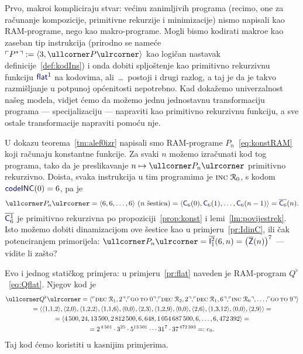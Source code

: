 Prvo, makroi kompliciraju stvar: većinu zanimljivih programa (recimo, one za računanje kompozicije, primitivne rekurzije i minimizacije) nismo napisali kao RAM-programe, nego kao makro-programe. Mogli bismo kodirati makroe kao zaseban tip instrukcija (prirodno se nameće $\kins{P^*}:=\langle3,\kprog{P}\rangle$ kao logičan nastavak definicije~\ref{def:kodIns}) i onda dobiti spljoštenje kao primitivno rekurzivnu funkciju $\f{flat}^1$ na kodovima, ali~\ldots\ postoji i drugi razlog, a taj je da je takvo razmišljanje u potpunoj općenitosti nepotrebno. Kad dokažemo univerzalnost našeg modela, vidjet ćemo da možemo jednu jednostavnu transformaciju programa --- specijalizaciju --- napraviti kao primitivno rekurzivnu funkciju, a sve ostale transformacije napraviti pomoću nje.


\begin{primjer}[{name=[primitivna rekurzivnost generatora koda za konstantne funkcije]}]\label{pr:kodkonst}
U dokazu teorema~\ref{tm:alef0izr} napisali smo RAM-pro\-gra\-me $P_n$~\eqref{eq:konstRAM} koji računaju konstantne funkcije. Za svaki $n$ možemo izračunati kod tog programa, tako da je preslikavanje $n\mapsto\kprog{P_n}$ primitivno rekurzivno. Doista, svaka instrukcija u tim programima je $\textsc{inc}\;\mathcal R_{0}$, s kodom $\f{codeINC}(0)=6$, pa je
\begin{equation}
    \kprog{P_n}=\langle6,6,\dotsc,6\rangle\text{ ($n$ šestica)}=\langle \f C_6(0),\f C_6(1),\dotsc,\f C_6(n-1)\rangle=\overline{\f C_6}(n)\text.
\end{equation}
$\overline{\f C_6^1}$ je primitivno rekurzivna po propoziciji~\ref{prop:konst} i lemi~\ref{lm:povijestrek}.
    Isto možemo dobiti dinamizacijom ove šestice kao u primjeru~\ref{pr:IdinC}, ili čak potenciranjem primorijela: $\kprog{P_n}=\overline{\f I_1^2}(6,n)=\bigl(\overline{\f Z}(n)\bigr)^7$ --- vidite li zašto?
\end{primjer}

\begin{primjer}[{name=[kod spljoštenja programa $Q$]}]\label{pr:Qflatkod}
Evo i jednog statičkog primjera: u primjeru~\ref{pr:flat} naveden je RAM-program $Q^\flat$~\eqref{eq:Qflat}. Njegov kod je
\begin{multline}
    \kprog{Q^\flat}=\langle\kins{\decr12},\!\kins{\goto\;0},\!\kins{\decr22},\!\kins{\decr16},\!\kins{\incr0},\dotsc,\!\kins{\goto\;9}\rangle\\
    =\langle\langle1,\!1,\!2\rangle,\langle2,\!0\rangle,\langle1,\!2,\!2\rangle,\langle1,\!1,\!6\rangle,\langle0,\!0\rangle,\langle2,\!3\rangle,\langle1,\!2,\!9\rangle,\langle0,\!0\rangle,\langle2,\!6\rangle,\langle1,\!3,\!12\rangle,\langle0,\!0\rangle,\langle2,\!9\rangle\rangle=\\
    =\langle4\,500,24,13\,500,2\,812\,500,6,648,1\,054\,687\,500,6,\dotsc,6,472\,392\rangle=\\
    =2^{\,4\,501}\cdot3^{25}\cdot5^{13\,501}\mathbin{\dotsm}31^7\cdot37^{\,472\,393}=:e_0\text.
\end{multline}
Taj kod ćemo koristiti u kasnijim primjerima.
\end{primjer}

